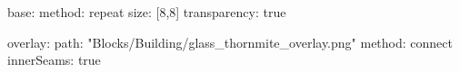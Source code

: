 base:
  method: repeat
  size: [8,8]
  transparency: true

overlay:
  path: "Blocks/Building/glass_thornmite_overlay.png"
  method: connect
  innerSeams: true